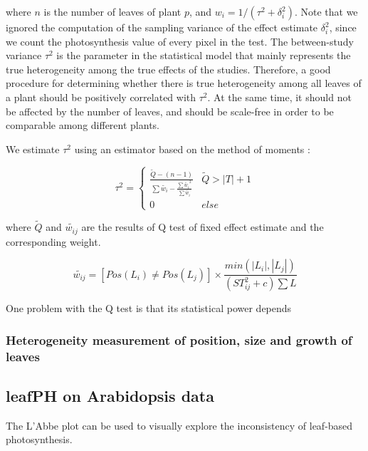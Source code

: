 {\noindent where $n$ is the number of leaves of plant $p$, and $w_i=1/(\tau^2+\delta_i^2)$. Note that we ignored the computation of the sampling variance of the effect estimate $\delta_i^2$, since we count the photosynthesis value of every pixel in the test.
%
The between-study variance $\tau^2$ is the parameter in the statistical model that mainly represents the true heterogeneity among the true effects of the studies. Therefore, a good procedure for determining whether there is true heterogeneity among all leaves of a plant should be positively correlated with $\tau^2$. At the same time, it should not be affected by the number of leaves, and should be scale-free in order to be comparable among different plants.  

We estimate $\tau^2$ using an estimator based on the method of moments \cite{dersimonian1986meta}:

\begin{equation}\label{eq:tau}
\tau^2 = \left\{\begin{matrix}
 \frac{\widetilde{Q}-(n-1)}{\sum \widetilde{w_{i}}-\frac{\sum \widetilde{w_{i}}^2}{\sum \widetilde{w_{i}}}} & \widetilde{Q}>|T|+1\\
 0 & else
\end{matrix}\right.
\end{equation}

\noindent where $\widetilde{Q}$ and $\widetilde{w_{ij}}$ are the results of Q test of fixed effect estimate and the corresponding weight.

\begin{equation}\label{eq:weight}
\widetilde{w_{ij}}=[Pos(L_i)\neq  Pos(L_j)] \times \frac{min(|L_i|, |L_j|)}{(ST^2_{ij}+c) \sum L}
\end{equation}

One problem with the Q test is that its statistical power depends 

\subsubsection*{Heterogeneity measurement of position, size and growth of leaves}


\subsection*{leafPH on Arabidopsis data}

The L'Abbe plot can be used to visually explore the inconsistency of leaf-based photosynthesis.

}
